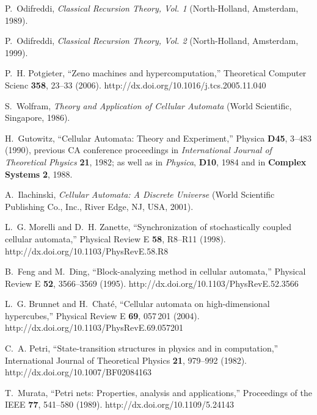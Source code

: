 \documentclass[pre,showpacs,showkeys,preprint]{revtex4}
\theoremstyle{definition}
\begin{document}
\begin{thebibliography}{10}
P.~Odifreddi, {\em Classical Recursion Theory, Vol. 1\/} (North-Holland,
  Amsterdam, 1989).

P.~Odifreddi, {\em Classical Recursion Theory, Vol. 2\/} (North-Holland,
  Amsterdam, 1999).

P.~H. Potgieter, \enquote{Zeno machines and hypercomputation,} Theoretical
  Computer Scienc {\bf 358}, 23--33 (2006).
\newline http://dx.doi.org/10.1016/j.tcs.2005.11.040

S.~Wolfram, {\em Theory and Application of Cellular Automata\/} (World
  Scientific, Singapore, 1986).

H.~Gutowitz, \enquote{Cellular Automata: Theory and Experiment,} Physica {\bf
  D45}, 3--483 (1990), previous CA conference proceedings in {\em International
  Journal of Theoretical Physics} {\bf 21}, 1982; as well as in {\em Physica},
  {\bf D10}, 1984 and in {\bf Complex Systems} {\bf 2}, 1988.

A.~Ilachinski, {\em Cellular Automata: A Discrete Universe\/} (World Scientific
  Publishing Co., Inc., River Edge, NJ, USA, 2001).

L.~G. Morelli and D.~H. Zanette, \enquote{Synchronization of stochastically
  coupled cellular automata,} Physical Review E {\bf 58}, R8--R11 (1998).
\newline http://dx.doi.org/10.1103/PhysRevE.58.R8

B.~Feng and M.~Ding, \enquote{Block-analyzing method in cellular automata,}
  Physical Review E {\bf 52}, 3566--3569 (1995).
\newline http://dx.doi.org/10.1103/PhysRevE.52.3566

L.~G. Brunnet and H.~Chat{\'{e}}, \enquote{Cellular automata on
  high-dimensional hypercubes,} Physical Review E {\bf 69}, 057\,201 (2004).
\newline http://dx.doi.org/10.1103/PhysRevE.69.057201

C.~A. Petri, \enquote{State-transition structures in physics and in
  computation,} International Journal of Theoretical Physics {\bf 21}, 979--992
  (1982).
\newline http://dx.doi.org/10.1007/BF02084163

T.~Murata, \enquote{Petri nets: Properties, analysis and applications,}
  Proceedings of the IEEE {\bf 77}, 541--580 (1989).
\newline http://dx.doi.org/10.1109/5.24143


\end{thebibliography}
\end{document}
